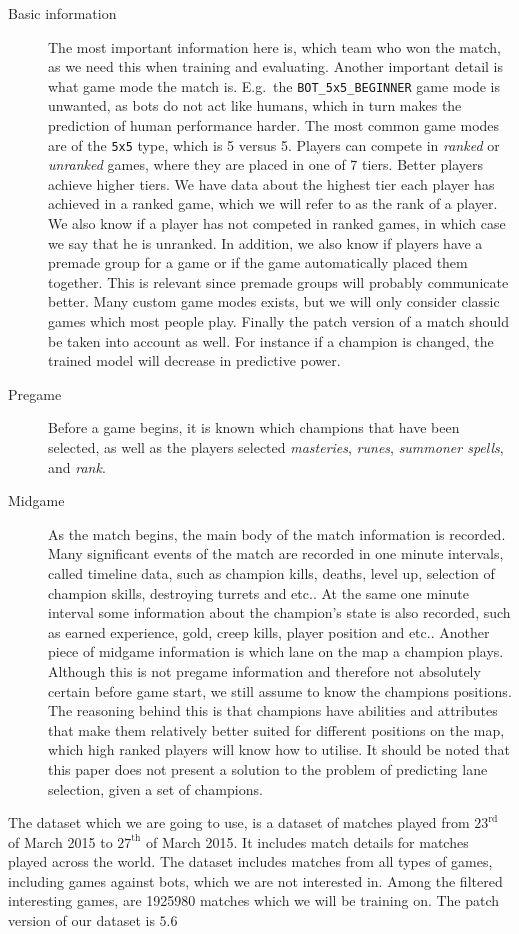\begin{description}
\item[Basic information] 
The most important information here is, which team who won the match, as we need this when training and evaluating. Another important detail is what game mode the match is. E.g.\ the \texttt{BOT\_5x5\_BEGINNER} game mode is unwanted, as bots do not act like humans, which in turn makes the prediction of human performance harder. The most common game modes are of the \texttt{5x5} type, which is 5 versus 5. Players can compete in \emph{ranked} or \emph{unranked} games, where they are placed in one of 7 tiers. Better players achieve higher tiers. 
We have data about the highest tier each player has achieved in a ranked game, which we will refer to as the rank of a player. We also know if a player has not competed in ranked games, in which case we say that he is unranked. In addition, we also know if players have a premade group for a game or if the game automatically placed them together. This is relevant since premade groups will probably communicate better. Many custom game modes exists, but we will only consider classic games which most people play. Finally the patch version of a match should be taken into account as well. For instance if a champion is changed, the trained model will decrease in predictive power.
\item[Pregame]
Before a game begins, it is known which champions that have been selected, as well as the players selected \textit{masteries}, \emph{runes}, \emph{summoner spells}, and \emph{rank}.
\item[Midgame]
As the match begins, the main body of the match information is recorded. Many significant events of the match are recorded in one minute intervals, called timeline data, such as champion kills, deaths, level up, selection of champion skills, destroying turrets and etc.. At the same one minute interval some information about the champion's state is also recorded, such as earned experience, gold, creep kills, player position and etc.. Another piece of midgame information is which lane on the map a champion plays. Although this is not pregame information and therefore not absolutely certain before game start, we still assume to know the champions positions. The reasoning behind this is that champions have abilities and attributes that make them relatively better suited for different positions on the map, which high ranked players will know how to utilise. It should be noted that this paper does not present a solution to the problem of predicting lane selection, given a set of champions.
\end{description}

The dataset which we are going to use, is a dataset of matches played from $23^{\text{rd}}$ of March 2015 to $27^{\text{th}}$ of March 2015. It includes match details for matches played across the world. The dataset includes matches from all types of games, including games against bots, which we are not interested in. Among the filtered interesting games, are 1925980 matches which we will be training on. The patch version of our dataset is $5.6$

